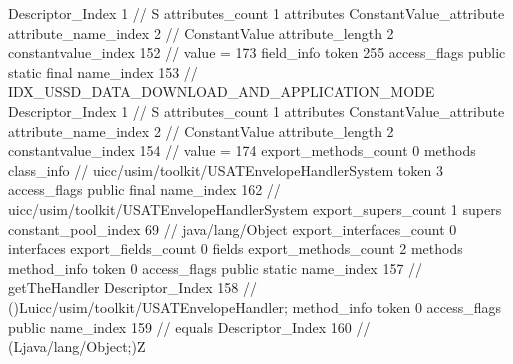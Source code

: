 {{{{{				Descriptor_Index	1		// S
				attributes_count	1
				attributes {
				ConstantValue_attribute {
					attribute_name_index	2		// ConstantValue
					attribute_length	2
					constantvalue_index	152		// value = 173
				}
				}
			}
			field_info {
				token	255
				access_flags	public static final
				name_index	153		// IDX_USSD_DATA_DOWNLOAD_AND_APPLICATION_MODE
				Descriptor_Index	1		// S
				attributes_count	1
				attributes {
				ConstantValue_attribute {
					attribute_name_index	2		// ConstantValue
					attribute_length	2
					constantvalue_index	154		// value = 174
				}
				}
			}
			}
			export_methods_count	0
			methods {
			}
		}
		class_info {		// uicc/usim/toolkit/USATEnvelopeHandlerSystem
			token	3
			access_flags	public final
			name_index	162		// uicc/usim/toolkit/USATEnvelopeHandlerSystem
			export_supers_count	1
			supers {
				constant_pool_index	69		// java/lang/Object
			}
			export_interfaces_count	0
			interfaces {
			}
			export_fields_count	0
			fields {
			}
			export_methods_count	2
			methods {
				method_info {
					token	0
					access_flags	public static
					name_index	157		// getTheHandler
					Descriptor_Index	158		// ()Luicc/usim/toolkit/USATEnvelopeHandler;
				}
				method_info {
					token	0
					access_flags	public
					name_index	159		// equals
					Descriptor_Index	160		// (Ljava/lang/Object;)Z
				}
			}
		}
	}
}
